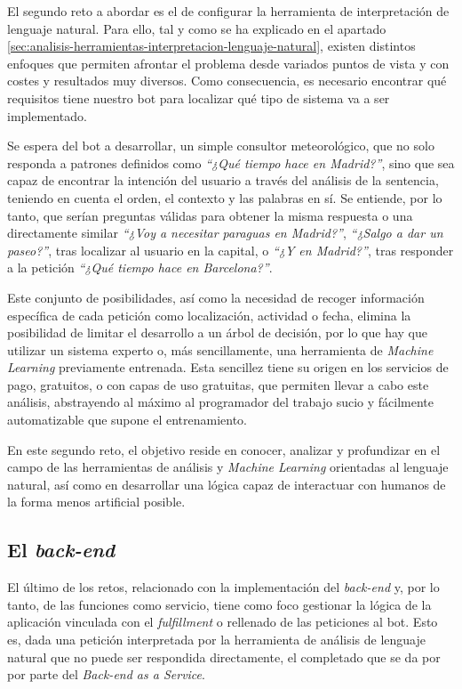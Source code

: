 \documentclass[11pt,spanish,listoffigures]{tfgetsinf}
\begin{document}
El segundo reto a abordar es el de configurar la herramienta de interpretación de lenguaje natural. Para ello, tal y como se ha explicado en el apartado \ref{sec:analisis-herramientas-interpretacion-lenguaje-natural}, existen distintos enfoques que permiten afrontar el problema desde variados puntos de vista y con costes y resultados muy diversos. Como consecuencia, es necesario encontrar qué requisitos tiene nuestro bot para localizar qué tipo de sistema va a ser implementado.

Se espera del bot a desarrollar, un simple consultor meteorológico, que no solo responda a patrones definidos como \textit{“¿Qué tiempo hace en Madrid?”}, sino que sea capaz de encontrar la intención del usuario a través del análisis de la sentencia, teniendo en cuenta el orden, el contexto y las palabras en sí. Se entiende, por lo tanto, que serían preguntas válidas para obtener la misma respuesta o una directamente similar \textit{“¿Voy a necesitar paraguas en Madrid?”}, \textit{“¿Salgo a dar un paseo?”}, tras localizar al usuario en la capital, o \textit{“¿Y en Madrid?”}, tras responder a la petición \textit{“¿Qué tiempo hace en Barcelona?”}. 

Este conjunto de posibilidades, así como la necesidad de recoger información específica de cada petición como localización, actividad o fecha, elimina la posibilidad de limitar el desarrollo a un árbol de decisión, por lo que hay que utilizar un sistema experto o, más sencillamente, una herramienta de \textit{Machine Learning} previamente entrenada. Esta sencillez tiene su origen en los servicios de pago, gratuitos, o con capas de uso gratuitas, que permiten llevar a cabo este análisis, abstrayendo al máximo al programador del trabajo sucio y fácilmente automatizable que supone el entrenamiento.

En este segundo reto, el objetivo reside en conocer, analizar y profundizar en el campo de las herramientas de análisis y \textit{Machine Learning} orientadas al lenguaje natural, así como en desarrollar una lógica capaz de interactuar con humanos de la forma menos artificial posible.

\subsection{El \textit{back-end}}
\label{subsec:el-back-end}

El último de los retos, relacionado con la implementación del \textit{back-end} y, por lo tanto, de las funciones como servicio, tiene como foco gestionar la lógica de la aplicación vinculada con el \textit{fulfillment} o rellenado de las peticiones al bot. Esto es, dada una petición interpretada por la herramienta de análisis de lenguaje natural que no puede ser respondida directamente, el completado que se da por por parte del \textit{Back-end as a Service}.
\end{document}
